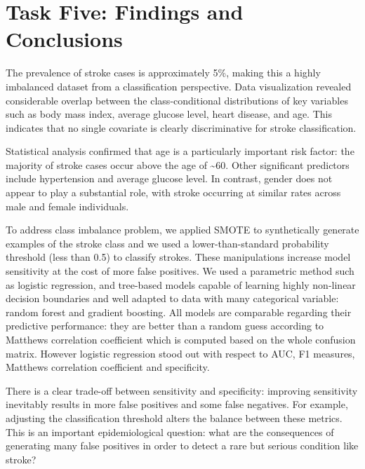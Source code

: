 \documentclass[
]{article}
\begin{document}
\section{Task Five: Findings and
Conclusions}\label{task-five-findings-and-conclusions}

The prevalence of stroke cases is approximately 5\%, making this a
highly imbalanced dataset from a classification perspective. Data
visualization revealed considerable overlap between the
class-conditional distributions of key variables such as body mass
index, average glucose level, heart disease, and age. This indicates
that no single covariate is clearly discriminative for stroke
classification.

Statistical analysis confirmed that age is a particularly important risk
factor: the majority of stroke cases occur above the age of
\textasciitilde60. Other significant predictors include hypertension and
average glucose level. In contrast, gender does not appear to play a
substantial role, with stroke occurring at similar rates across male and
female individuals.

To address class imbalance problem, we applied SMOTE to synthetically
generate examples of the stroke class and we used a lower-than-standard
probability threshold (less than 0.5) to classify strokes. These
manipulations increase model sensitivity at the cost of more false
positives. We used a parametric method such as logistic regression, and
tree-based models capable of learning highly non-linear decision
boundaries and well adapted to data with many categorical variable:
random forest and gradient boosting. All models are comparable regarding
their predictive performance: they are better than a random guess
according to Matthews correlation coefficient which is computed based on
the whole confusion matrix. However logistic regression stood out with
respect to AUC, F1 measures, Matthews correlation coefficient and
specificity.

There is a clear trade-off between sensitivity and specificity:
improving sensitivity inevitably results in more false positives and
some false negatives. For example, adjusting the classification
threshold alters the balance between these metrics. This is an important
epidemiological question: what are the consequences of generating many
false positives in order to detect a rare but serious condition like
stroke?
\end{document}
